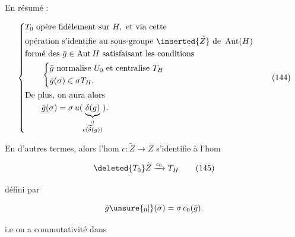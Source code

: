 
En résumé :

\[
\left\{\begin{aligned}
& T_0\ \text{opère fidèlement sur }H,\ \text{et via cette}\\
&\text{opération s'identifie au sous-groupe }\inserted{\widetilde Z}\ \text{de }\operatorname{Aut}(H)\\
&\text{formé des }\bar g\in\operatorname{Aut} H\ \text{satisfaisant les conditions}\\
&\qquad\left\{\begin{aligned}
&\bar g\ \text{normalise }U_0\ \text{et centralise }T_H\\
&\bar g(\sigma)\in\sigma T_H.
\end{aligned}\right.\\
&\text{De plus, on aura alors}\\
&\qquad\bar g(\sigma)=\sigma\,u(\underset{\substack{\shortparallel\\c(\widetilde\delta(g))}}{\underbrace{\delta(g)}}).
\end{aligned}\right.
\tag*{(144)}
\]


En d'autres termes,  alors l'hom $c:\widetilde Z\longrightarrow Z$ s'identifie à l'hom

\[
\deleted{T_0}\widetilde Z\xrightarrow{c_0}T_H\tag*{(145)}
\]

défini par

\[
\bar g\unsure{{}_0|{}}(\sigma)=\sigma\,c_0(\bar g).
\]

i.e on a commutativité dans


